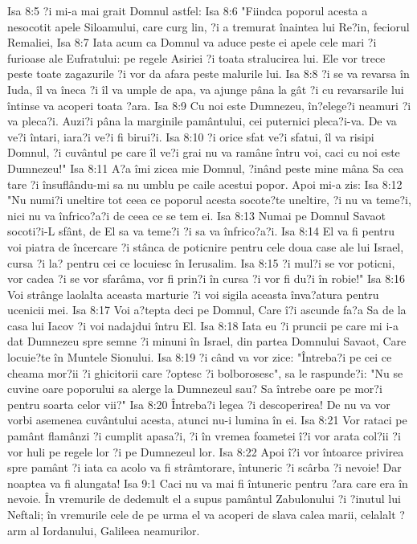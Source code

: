Isa 8:5  ?i mi-a mai grait Domnul astfel:
Isa 8:6  "Fiindca poporul acesta a nesocotit apele Siloamului, care curg lin, ?i a tremurat înaintea lui Re?in, feciorul Remaliei,
Isa 8:7  Iata acum ca Domnul va aduce peste ei apele cele mari ?i furioase ale Eufratului: pe regele Asiriei ?i toata stralucirea lui. Ele vor trece peste toate zagazurile ?i vor da afara peste malurile lui.
Isa 8:8  ?i se va revarsa în Iuda, îl va îneca ?i îl va umple de apa, va ajunge pâna la gât ?i cu revarsarile lui întinse va acoperi toata ?ara.
Isa 8:9  Cu noi este Dumnezeu, în?elege?i neamuri ?i va pleca?i. Auzi?i pâna la marginile pamântului, cei puternici pleca?i-va. De va ve?i întari, iara?i ve?i fi birui?i.
Isa 8:10  ?i orice sfat ve?i sfatui, îl va risipi Domnul, ?i cuvântul pe care îl ve?i grai nu va ramâne întru voi, caci cu noi este Dumnezeu!"
Isa 8:11  A?a îmi zicea mie Domnul, ?inând peste mine mâna Sa cea tare ?i însuflându-mi sa nu umblu pe caile acestui popor. Apoi mi-a zis:
Isa 8:12  "Nu numi?i uneltire tot ceea ce poporul acesta socote?te uneltire, ?i nu va teme?i, nici nu va înfrico?a?i de ceea ce se tem ei.
Isa 8:13  Numai pe Domnul Savaot socoti?i-L sfânt, de El sa va teme?i ?i sa va înfrico?a?i.
Isa 8:14  El va fi pentru voi piatra de încercare ?i stânca de poticnire pentru cele doua case ale lui Israel, cursa ?i la? pentru cei ce locuiesc în Ierusalim.
Isa 8:15  ?i mul?i se vor poticni, vor cadea ?i se vor sfarâma, vor fi prin?i în cursa ?i vor fi du?i în robie!"
Isa 8:16  Voi strânge laolalta aceasta marturie ?i voi sigila aceasta înva?atura pentru ucenicii mei.
Isa 8:17  Voi a?tepta deci pe Domnul, Care î?i ascunde fa?a Sa de la casa lui Iacov ?i voi nadajdui întru El.
Isa 8:18  Iata eu ?i pruncii pe care mi i-a dat Dumnezeu spre semne ?i minuni în Israel, din partea Domnului Savaot, Care locuie?te în Muntele Sionului.
Isa 8:19  ?i când va vor zice: "Întreba?i pe cei ce cheama mor?ii ?i ghicitorii care ?optesc ?i bolborosesc", sa le raspunde?i: "Nu se cuvine oare poporului sa alerge la Dumnezeul sau? Sa întrebe oare pe mor?i pentru soarta celor vii?"
Isa 8:20  Întreba?i legea ?i descoperirea! De nu va vor vorbi asemenea cuvântului acesta, atunci nu-i lumina în ei.
Isa 8:21  Vor rataci pe pamânt flamânzi ?i cumplit apasa?i, ?i în vremea foametei î?i vor arata col?ii ?i vor huli pe regele lor ?i pe Dumnezeul lor.
Isa 8:22  Apoi î?i vor întoarce privirea spre pamânt ?i iata ca acolo va fi strâmtorare, întuneric ?i scârba ?i nevoie! Dar noaptea va fi alungata!
Isa 9:1  Caci nu va mai fi întuneric pentru ?ara care era în nevoie. În vremurile de dedemult el a supus pamântul Zabulonului ?i ?inutul lui Neftali; în vremurile cele de pe urma el va acoperi de slava calea marii, celalalt ?arm al Iordanului, Galileea neamurilor.
